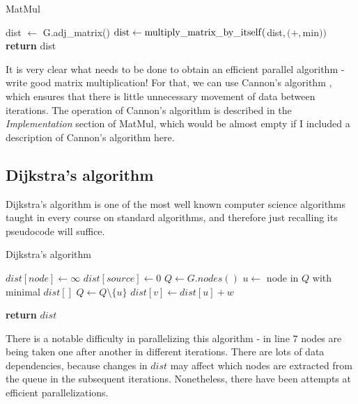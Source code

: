 \documentclass[12pt,a4paper,twoside,openright]{report}
\begin{document}
\begin{algorithm}
\caption{MatMul}\label{matmul}
\begin{algorithmic}[1]
\State dist $\gets$ G.adj\_matrix()
        \State $\rm{dist} \gets {\rm multiply\_matrix\_by\_itself}($dist$,(+,$min$))$
      \EndFor
\State \textbf{return} dist
\EndProcedure
\end{algorithmic}
\end{algorithm}

It is very clear what needs to be done to obtain an efficient parallel algorithm - write good matrix multiplication! For that, we can use Cannon's algorithm \cite{cannon}, which ensures that there is little unnecessary movement of data between iterations. The operation of Cannon's algorithm is described in the \textit{Implementation} section of MatMul, which would be almost empty if I included a description of Cannon's algorithm here. 

\subsection{Dijkstra's algorithm}
Dijkstra's algorithm is one of the most well known computer science algorithms taught in every course on standard algorithms, and therefore just recalling its pseudocode will suffice.

\begin{algorithm}
\caption{Dijkstra's algorithm}\label{dijkstra}
\begin{algorithmic}[1]
    \State $dist[node] \gets \infty$
\EndFor
\State $dist[source] \gets 0$
\State $Q \gets G.nodes()$
        \State $u \gets$ node in $Q$ with minimal $dist[]$
        \State $Q \gets Q \setminus \{u\}$
            \State $dist[v] \gets dist[u] + w$
        \EndIf
      \EndFor
    \EndWhile
    
    
\State \textbf{return} $dist$
\EndProcedure
\end{algorithmic}
\end{algorithm}

There is a notable difficulty in parallelizing this algorithm - in line $7$ nodes are being taken one after another in different iterations. There are lots of data dependencies, because changes in $dist$ may affect which nodes are extracted from the queue in the subsequent iterations. Nonetheless, there have been attempts at efficient parallelizations.
\end{document}
